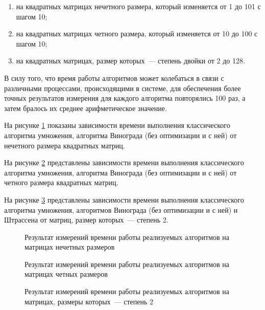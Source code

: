 \begin{enumerate}
    \item на квадратных матрицах нечетного размера, который изменяется от 1 до 101 с шагом 10;
    \item на квадратных матрицах четного размера, который изменяется от 10 до 100 с шагом 10;
    \item на квадратных матрицах, размер которых~--- степень двойки от 2 до 128.
\end{enumerate}


В силу того, что время работы алгоритмов может колебаться в связи с различными процессами, происходящими в системе, для обеспечения более точных результатов измерения для каждого алгоритма повторялись 100 раз, а затем бралось их среднее арифметическое значение.

На рисунке \ref{fig:odd-time} показаны зависимости времени выполнения классического алгоритма умножения, алгоритма Винограда (без оптимизации и с ней) от нечетного размера квадратных матриц.

На рисунке \ref{fig:even-time} представлены зависимости времени выполнения классического алгоритма умножения, алгоритма Винограда (без оптимизации и с ней) от четного размера квадратных матриц.

На рисунке \ref{fig:strassen} представлены зависимости времени выполнения классического алгоритма умножения, алгоритмов Винограда (без оптимизации и с ней) и Штрассена от матриц, размер которых~--- степень 2.


\begin{figure}[H]
    \centering
    
    \caption{Результат измерений времени работы реализуемых алгоритмов на матрицах нечетных размеров}
    \label{fig:odd-time}
\end{figure}

\begin{figure}[H]
    \centering
    
    \caption{Результат измерений времени работы реализуемых алгоритмов на матрицах четных размеров}
    \label{fig:even-time}
\end{figure}

\begin{figure}[H]
    \centering
    
    \caption{Результат измерений времени работы реализуемых алгоритмов на матрицах, размеры которых~--- степень 2}
    \label{fig:strassen}
\end{figure}

